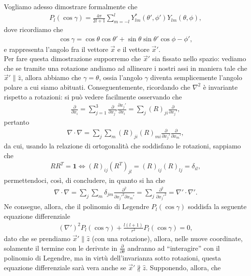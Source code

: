 Vogliamo adesso dimostrare formalmente che
\begin{align}
	P_l(\cos{\gamma}) = \frac{4 \pi}{2l+1} \sum_{m=-l}^l Y^*_{lm}(\theta', \phi') Y_{lm}(\theta, \phi),
\end{align}
dove ricordiamo che
\begin{align}
	\cos{\gamma} = \cos{\theta} \cos{\theta'} + \sin{\theta} \sin{\theta'} \cos{\phi - \phi'},
\end{align}
e rappresenta l'angolo fra il vettore $\vec{x}$ e il vettore $\vec{x}'$. \\
Per fare questa dimostrazione supporremo che $\vec{x}'$ sia fissato nello spazio: vediamo che se tramite una rotazione andiamo ad allineare i nostri assi in maniera tale che $\vec{x}' \parallel \hat{z}$, allora abbiamo che $\gamma = \theta$, ossia l'angolo $\gamma$ diventa semplicemente l'angolo polare a cui siamo abituati. 
Conseguentemente, ricordando che $\nabla^2$ è invariante rispetto a rotazioni: si può vedere facilmente osservando che
\begin{align}
	\frac{\partial}{\partial x_i} = \sum_{j=1}^3 \frac{\partial}{\partial x_j'} \frac{\partial x_j'}{\partial x_i} = \sum_j (R)_{ji} \frac{\partial}{\partial x_j'},
\end{align}
pertanto
\begin{align}
	\nabla \cdot \nabla = \sum_j \sum_m (R)_{ji} (R)_{mi} \frac{\partial}{\partial x_j'} \frac{\partial}{\partial x_m'},
\end{align}
da cui, usando la relazione di ortogonalità che soddisfano le rotazioni, sappiamo che
\begin{align}
	R R^T = \mathbf{1} \iff (R)_{ij} (R^T)_{jl} = (R)_{ij} (R)_{lj} = \delta_{il},
\end{align}
permettendoci, così, di concludere, in quanto si ha che
\begin{align}
	\nabla \cdot \nabla = \sum_{j} \sum_m \delta_{jm} \frac{\partial^2}{\partial x_j'^2 \partial x_m'} = \sum_j \frac{\partial^2}{\partial x_j'^2} = \nabla' \cdot \nabla'.
\end{align}
Ne consegue, allora, che il polinomio di Legendre $P_l(\cos{\gamma})$ soddisfa la seguente equazione differenziale
\begin{align}
	(\nabla')^2 P_l(\cos{\gamma}) + \frac{l(l+1)}{r^2} P_l(\cos{\gamma}) = 0,
\end{align}
dato che se prendiamo $\vec{x}' \parallel \hat{z}$ (con una rotazione), allora, nelle nuove coordinate, solamente il termine con le derivate in $\frac{\partial}{\partial \theta}$ andranno ad ``interagire'' con il polinomio di Legendre, ma in virtù dell'invarianza sotto rotazioni, questa equazione differenziale sarà vera anche se $\vec{x}' \not\parallel \hat{z}$. Supponendo, allora, che
